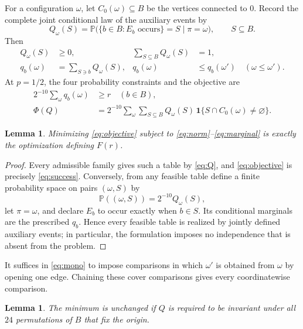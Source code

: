\documentclass[11pt]{article}
\newtheorem{lemma}[theorem]{Lemma}
\newcommand{\Prob}{\mathbb P}
\begin{document}
For a configuration $\omega$, let $C_0(\omega)\subseteq B$ be the vertices
connected to $0$.  Record the complete joint conditional law of the auxiliary
events by
\begin{equation}\label{eq:Q}
 Q_\omega(S)=\Prob\bigl(\{b\in B:E_b\text{ occurs}\}=S
                    \mid\pi=\omega\bigr),\qquad S\subseteq B.
\end{equation}
Then
\begin{align}
 Q_\omega(S)&\geq0,&
 \sum_{S\subseteq B}Q_\omega(S)&=1,\label{eq:norm}\\
 q_b(\omega)&=\sum_{S\ni b}Q_\omega(S),&
 q_b(\omega)&\leq q_b(\omega')\quad(\omega\leq\omega').
 \label{eq:mono}
\end{align}
At $p=1/2$, the four probability constraints and the objective are
\begin{align}
 2^{-10}\sum_\omega q_b(\omega)&\geq r \quad(b\in B),
 \label{eq:marginal}\\
 \Phi(Q)&=2^{-10}\sum_\omega\sum_{S\subseteq B}
 Q_\omega(S)\,\mathbf 1\{S\cap C_0(\omega)\neq\varnothing\}.
 \label{eq:objective}
\end{align}

\begin{lemma}\label{lem:lossless}
Minimizing \eqref{eq:objective} subject to
\eqref{eq:norm}--\eqref{eq:marginal} is exactly the optimization defining
$F(r)$.
\end{lemma}

\begin{proof}
Every admissible family gives such a table by \eqref{eq:Q}, and
\eqref{eq:objective} is precisely \eqref{eq:success}.  Conversely, from any
feasible table define a finite probability space on pairs $(\omega,S)$ by
\[
 \Prob((\omega,S))=2^{-10}Q_\omega(S),
\]
let $\pi=\omega$, and declare $E_b$ to occur exactly when $b\in S$.  Its
conditional marginals are the prescribed $q_b$.  Hence every feasible table
is realized by jointly defined auxiliary events; in particular, the
formulation imposes no independence that is absent from the problem.
\end{proof}

It suffices in \eqref{eq:mono} to impose comparisons in which $\omega'$ is
obtained from $\omega$ by opening one edge.  Chaining these cover comparisons
gives every coordinatewise comparison.

\begin{lemma}\label{lem:symmetry}
The minimum is unchanged if $Q$ is required to be invariant under all $24$
permutations of $B$ that fix the origin.
\end{lemma}
\end{document}
